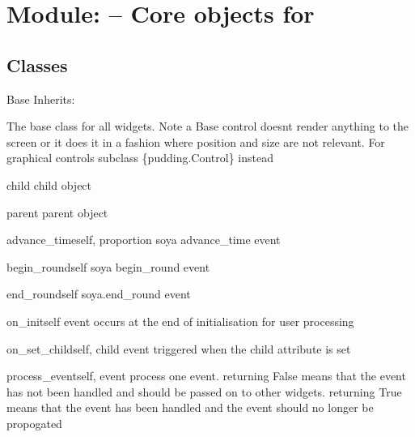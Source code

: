 \section{Module:  -- Core objects for }
\subsection{Classes}
\begin{classdesc*}{Base}
Inherits:

The base class for all widgets. Note a Base control doesnt render 
anything to the screen or it does it in a fashion where position and size 
are not relevant. For graphical controls subclass \class\{pudding.Control\}
instead

\begin{memberdesc}{child}
child object
\end{memberdesc}

\begin{memberdesc}{parent}
parent object
\end{memberdesc}

\begin{methoddesc}{advance_time}{self, proportion}
soya advance\_time event
\end{methoddesc}

\begin{methoddesc}{begin_round}{self}
soya begin\_round event
\end{methoddesc}

\begin{methoddesc}{end_round}{self}
soya.end\_round event
\end{methoddesc}

\begin{methoddesc}{on_init}{self}
event occurs at the end of initialisation for user processing
\end{methoddesc}

\begin{methoddesc}{on_set_child}{self, child}
event triggered when the child attribute is set
\end{methoddesc}

\begin{methoddesc}{process_event}{self, event}
process one event. returning False means that the event has not been
handled and should be passed on to other widgets. returning True means
that the event has been handled and the event should no longer be 
propogated
\end{methoddesc}

\end{classdesc*}

